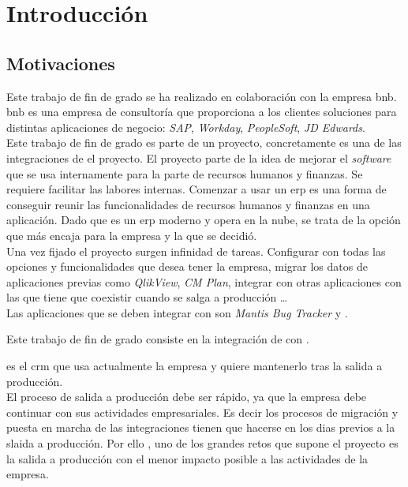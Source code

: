 \chapter{Introducción}


\section{Motivaciones}
Este trabajo de fin de grado se ha realizado en colaboración con la empresa \acrfull{bnb}.
\acrshort{bnb} es una empresa de consultoría que proporciona a los clientes soluciones para distintas aplicaciones de negocio: \textit{SAP}, \textit{Workday}, \textit{PeopleSoft}, \textit{JD Edwards}.\\

Este trabajo de fin de grado es parte de un proyecto, concretamente es una de las integraciones de el proyecto.
El proyecto parte de la idea de mejorar el \textit{software} que se usa internamente para la parte de recursos humanos y finanzas. Se requiere facilitar las labores internas.
Comenzar a usar un \acrshort{erp} es una forma de conseguir reunir las funcionalidades de recursos humanos y finanzas en una aplicación.
Dado que \wday{} es un \acrshort{erp} moderno y opera en la nube, se trata de la opción que más encaja para la empresa y la que se decidió.
\\

Una vez fijado el proyecto surgen infinidad de tareas. Configurar \wday{} con todas las opciones y funcionalidades que desea tener la empresa, migrar los datos de aplicaciones previas como \textit{QlikView}, \textit{CM Plan}, 
integrar \wday{} con otras aplicaciones con las que tiene que coexistir cuando se salga a producción \ldots\\

Las aplicaciones que se deben integrar con \wday{} son \textit{Mantis Bug Tracker} y \hs{}.

Este trabajo de fin de grado consiste en la integración de \wday{} con \hs{}.

\hs{} es el \acrshort{crm} que usa actualmente la empresa y quiere mantenerlo tras la salida a producción.\\


El proceso de salida a producción debe ser rápido, ya que la empresa debe continuar con sus actividades empresariales. 
Es decir los procesos de migración y puesta en marcha de las integraciones tienen que hacerse en los dias previos a la slaida a producción.
Por ello , uno de los grandes retos que supone el proyecto es la salida a producción con el menor impacto posible a las actividades de la empresa.\\



